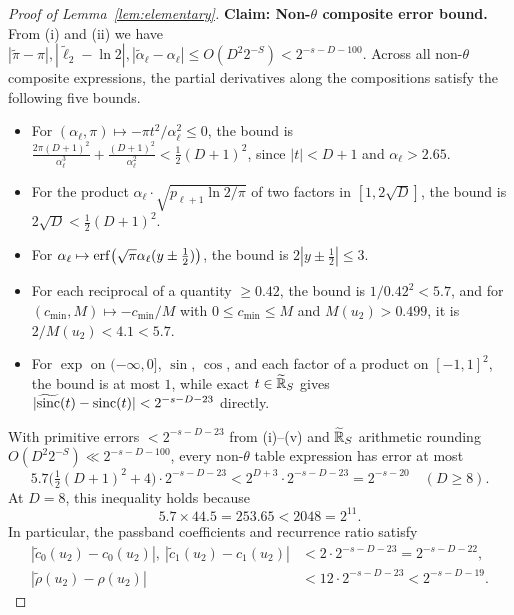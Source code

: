 \begin{proof}[Proof of Lemma~\ref{lem:elementary}]
\textbf{Claim: Non-$\theta$ composite error bound.}
From (i) and (ii) we have $|\tilde{\pi} - \pi|, |\tilde{\ell}_2 - \ln 2|, |\tilde{\alpha}_\ell - \alpha_\ell| \le O(D^2 2^{-S}) < 2^{-s-D-100}$. Across all non-$\theta$ composite expressions, the partial derivatives along the compositions satisfy the following five bounds.
\begin{itemize}[leftmargin=*,nosep]
  \item For $(\alpha_\ell, \pi) \mapsto -\pi t^2 / \alpha_\ell^2 \le 0$, the bound is $\frac{2\pi(D+1)^2}{\alpha_\ell^3} + \frac{(D+1)^2}{\alpha_\ell^2} < \frac{1}{2}(D+1)^2$, since $|t| < D + 1$ and $\alpha_\ell > 2.65$.
  \item For the product $\alpha_\ell \cdot \sqrt{p_{\ell+1}\ln 2/\pi}$ of two factors in $[1, 2\sqrt{D}]$, the bound is $2\sqrt{D} < \frac{1}{2}(D+1)^2$.
  \item For $\alpha_\ell \mapsto \operatorname{erf}\bigl(\sqrt{\pi}\alpha_\ell(y \pm \frac{1}{2})\bigr)$, the bound is $2|y \pm \frac{1}{2}| \le 3$.
  \item For each reciprocal of a quantity $\ge 0.42$, the bound is $1/0.42^2 < 5.7$, and for $(c_{\min}, M) \mapsto -c_{\min}/M$ with $0 \le c_{\min} \le M$ and $M(u_2) > 0.499$, it is $2/M(u_2) < 4.1 < 5.7$.
  \item For $\exp$ on $(-\infty, 0]$, $\sin$, $\cos$, and each factor of a product on $[-1, 1]^2$, the bound is at most $1$, while exact $t \in \widetilde{\mathbb{R}}_S$ gives $|\widetilde{\operatorname{sinc}}(t) - \operatorname{sinc}(t)| < 2^{-s-D-23}$ directly.
\end{itemize}
With primitive errors $< 2^{-s-D-23}$ from (i)--(v) and $\widetilde{\mathbb{R}}_S$ arithmetic rounding $O(D^2 2^{-S}) \ll 2^{-s-D-100}$, every non-$\theta$ table expression has error at most
\[
  5.7\bigl(\tfrac{1}{2}(D+1)^2 + 4\bigr) \cdot 2^{-s-D-23} < 2^{D+3} \cdot 2^{-s-D-23} = 2^{-s-20} \quad (D \ge 8).
\]
At $D = 8$, this inequality holds because
\[
  5.7 \times 44.5 = 253.65 < 2048 = 2^{11}.
\]
In particular, the passband coefficients and recurrence ratio satisfy
\begin{align*}
  |\tilde{c}_0(u_2) - c_0(u_2)|,\ |\tilde{c}_1(u_2) - c_1(u_2)| &< 2 \cdot 2^{-s-D-23} = 2^{-s-D-22}, \\
  |\tilde{\rho}(u_2) - \rho(u_2)| &< 12 \cdot 2^{-s-D-23} < 2^{-s-D-19}.
\end{align*}


\end{proof}
